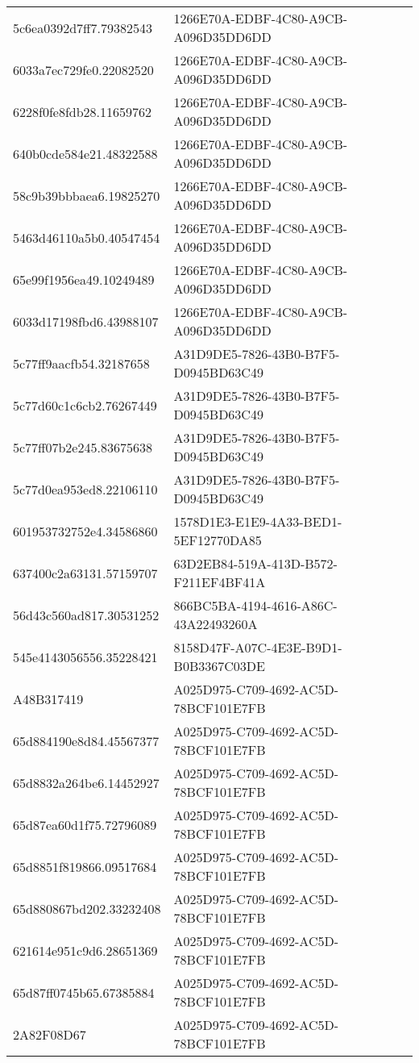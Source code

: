\begin{tabular}{ll}
5c6ea0392d7ff7.79382543 & 1266E70A-EDBF-4C80-A9CB-A096D35DD6DD \\
6033a7ec729fe0.22082520 & 1266E70A-EDBF-4C80-A9CB-A096D35DD6DD \\
6228f0fe8fdb28.11659762 & 1266E70A-EDBF-4C80-A9CB-A096D35DD6DD \\
640b0cde584e21.48322588 & 1266E70A-EDBF-4C80-A9CB-A096D35DD6DD \\
58c9b39bbbaea6.19825270 & 1266E70A-EDBF-4C80-A9CB-A096D35DD6DD \\
5463d46110a5b0.40547454 & 1266E70A-EDBF-4C80-A9CB-A096D35DD6DD \\
65e99f1956ea49.10249489 & 1266E70A-EDBF-4C80-A9CB-A096D35DD6DD \\
6033d17198fbd6.43988107 & 1266E70A-EDBF-4C80-A9CB-A096D35DD6DD \\
5c77ff9aacfb54.32187658 & A31D9DE5-7826-43B0-B7F5-D0945BD63C49 \\
5c77d60c1c6cb2.76267449 & A31D9DE5-7826-43B0-B7F5-D0945BD63C49 \\
5c77ff07b2e245.83675638 & A31D9DE5-7826-43B0-B7F5-D0945BD63C49 \\
5c77d0ea953ed8.22106110 & A31D9DE5-7826-43B0-B7F5-D0945BD63C49 \\
601953732752e4.34586860 & 1578D1E3-E1E9-4A33-BED1-5EF12770DA85 \\
637400c2a63131.57159707 & 63D2EB84-519A-413D-B572-F211EF4BF41A \\
56d43c560ad817.30531252 & 866BC5BA-4194-4616-A86C-43A22493260A \\
545e4143056556.35228421 & 8158D47F-A07C-4E3E-B9D1-B0B3367C03DE \\
A48B317419 & A025D975-C709-4692-AC5D-78BCF101E7FB \\
65d884190e8d84.45567377 & A025D975-C709-4692-AC5D-78BCF101E7FB \\
65d8832a264be6.14452927 & A025D975-C709-4692-AC5D-78BCF101E7FB \\
65d87ea60d1f75.72796089 & A025D975-C709-4692-AC5D-78BCF101E7FB \\
65d8851f819866.09517684 & A025D975-C709-4692-AC5D-78BCF101E7FB \\
65d880867bd202.33232408 & A025D975-C709-4692-AC5D-78BCF101E7FB \\
621614e951c9d6.28651369 & A025D975-C709-4692-AC5D-78BCF101E7FB \\
65d87ff0745b65.67385884 & A025D975-C709-4692-AC5D-78BCF101E7FB \\
2A82F08D67 & A025D975-C709-4692-AC5D-78BCF101E7FB \\

\end{tabular}
